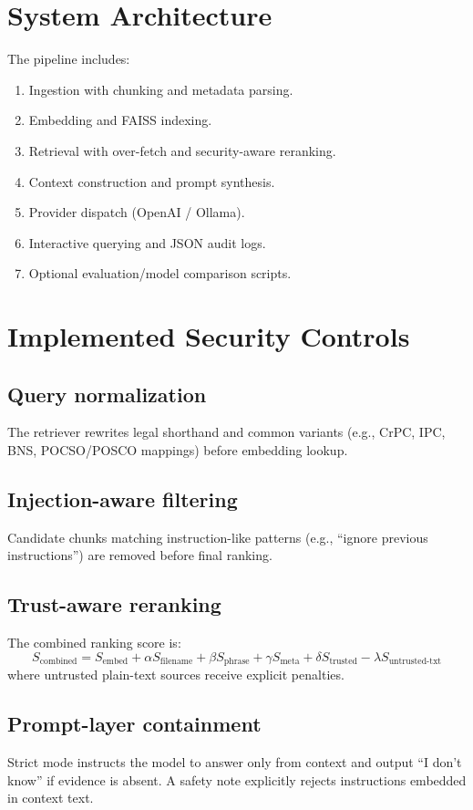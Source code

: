 \documentclass[conference]{IEEEtran}
\begin{document}
\section{System Architecture}
The pipeline includes:
\begin{enumerate}
    \item Ingestion with chunking and metadata parsing.
    \item Embedding and FAISS indexing.
    \item Retrieval with over-fetch and security-aware reranking.
    \item Context construction and prompt synthesis.
    \item Provider dispatch (OpenAI / Ollama).
    \item Interactive querying and JSON audit logs.
    \item Optional evaluation/model comparison scripts.
\end{enumerate}

\section{Implemented Security Controls}
\subsection{Query normalization}
The retriever rewrites legal shorthand and common variants (e.g., CrPC, IPC, BNS, POCSO/POSCO mappings) before embedding lookup.

\subsection{Injection-aware filtering}
Candidate chunks matching instruction-like patterns (e.g., ``ignore previous instructions'') are removed before final ranking.

\subsection{Trust-aware reranking}
The combined ranking score is:
\begin{equation}
S_{\text{combined}} = S_{\text{embed}} + \alpha S_{\text{filename}} + \beta S_{\text{phrase}} + \gamma S_{\text{meta}} + \delta S_{\text{trusted}} - \lambda S_{\text{untrusted-txt}}
\end{equation}
where untrusted plain-text sources receive explicit penalties.

\subsection{Prompt-layer containment}
Strict mode instructs the model to answer only from context and output ``I don't know'' if evidence is absent. A safety note explicitly rejects instructions embedded in context text.
\end{document}
